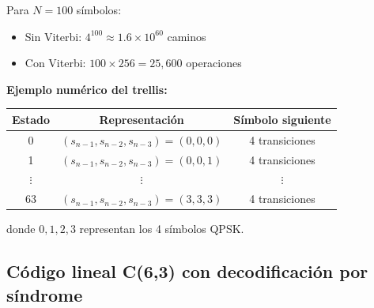\documentclass[10pt,a4paper]{article}
\begin{document}
\begin{solucion}
Para $N = 100$ símbolos:
\begin{itemize}
\item Sin Viterbi: $4^{100} \approx 1.6 \times 10^{60}$ caminos
\item Con Viterbi: $100 \times 256 = 25,600$ operaciones
\end{itemize}

\textbf{Ejemplo numérico del trellis:}

\begin{center}
\begin{tabular}{|c|c|c|}
\hline
\textbf{Estado} & \textbf{Representación} & \textbf{Símbolo siguiente} \\
\hline
0 & $(s_{n-1}, s_{n-2}, s_{n-3}) = (0,0,0)$ & 4 transiciones \\
1 & $(s_{n-1}, s_{n-2}, s_{n-3}) = (0,0,1)$ & 4 transiciones \\
$\vdots$ & $\vdots$ & $\vdots$ \\
63 & $(s_{n-1}, s_{n-2}, s_{n-3}) = (3,3,3)$ & 4 transiciones \\
\hline
\end{tabular}
\end{center}

donde $0, 1, 2, 3$ representan los 4 símbolos QPSK.
\end{solucion}

\subsection{Código lineal C(6,3) con decodificación por síndrome}
\end{document}
